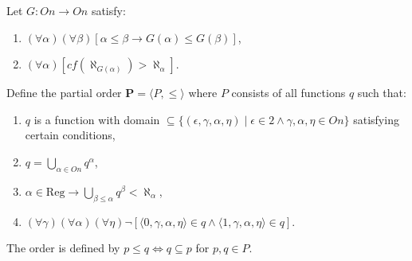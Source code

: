 Let $G: On \rightarrow On$ satisfy:
\begin{enumerate}
\item $(\forall \alpha)(\forall \beta)[\alpha \leq \beta \rightarrow G(\alpha) \leq G(\beta)]$,
\item $(\forall \alpha)[cf(\aleph_{G(\alpha)}) > \aleph_\alpha]$.
\end{enumerate}
Define the partial order $\mathbf{P} = \langle P, \leq \rangle$ where $P$ consists of all functions $q$ such that:
\begin{enumerate}
\item[(i)] $q$ is a function with domain $\subseteq \{(\epsilon, \gamma, \alpha, \eta) \mid \epsilon \in 2 \land \gamma, \alpha, \eta \in On\}$ satisfying certain conditions,
\item[(ii)] $q = \bigcup_{\alpha \in On} q^\alpha$,
\item[(iii)] $\alpha \in \text{Reg} \rightarrow \bigcup_{\beta \leq \alpha} q^\beta < \aleph_\alpha$,
\item[(iv)] $(\forall \gamma)(\forall \alpha)(\forall \eta) \neg [\langle 0, \gamma, \alpha, \eta \rangle \in q \land \langle 1, \gamma, \alpha, \eta \rangle \in q]$.
\end{enumerate}
The order is defined by $p \leq q \iff q \subseteq p$ for $p, q \in P$.
